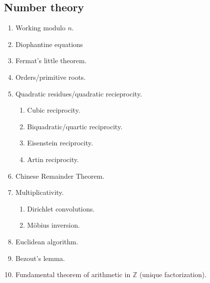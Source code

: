 \documentclass{article}
\begin{document}
\subsection*{Number theory}
\begin{enumerate}
\item[\underline{\hspace{0.4cm}}] Working modulo $n$.
\item[\underline{\hspace{0.4cm}}] Diophantine equations
\item[\underline{\hspace{0.4cm}}] Fermat's little theorem.
\item[\underline{\hspace{0.4cm}}] Orders/primitive roots.
\item[\underline{\hspace{0.4cm}}] Quadratic residues/quadratic recieprocity.
\begin{enumerate}
\item[\underline{\hspace{0.4cm}}] Cubic reciprocity.
\item[\underline{\hspace{0.4cm}}] Biquadratic/quartic reciprocity.
\item[\underline{\hspace{0.4cm}}] Eisenstein reciprocity.
\item[\underline{\hspace{0.4cm}}] Artin reciprocity.
\end{enumerate}
\item[\underline{\hspace{0.4cm}}] Chinese Remainder Theorem.
\item[\underline{\hspace{0.4cm}}] Multiplicativity.
\begin{enumerate}
\item[\underline{\hspace{0.4cm}}] Dirichlet convolutions.
\item[\underline{\hspace{0.4cm}}] M\"{o}bius inversion.
\end{enumerate}
\item[\underline{\hspace{0.4cm}}] Euclidean algorithm.
\item[\underline{\hspace{0.4cm}}] Bezout's lemma.
\item[\underline{\hspace{0.4cm}}] Fundamental theorem of arithmetic in $\mathbb{Z}$ (unique factorization).

\end{enumerate}
\end{document}
